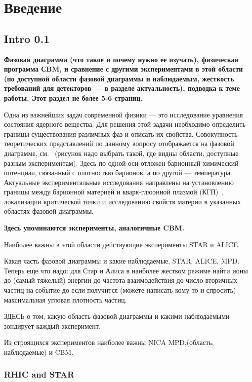 \chapter*{Введение}\label{sec:secIntro}

\section*{Intro 0.1}
\textbf{Фазовая диаграмма (что такое и почему нужно ее изучать), физическая программа СBM, и сравнение с другими экспериментами в этой области (по доступной области фазовой диаграммы и наблюдаемым, жесткость требований для детекторов --- в разделе актуальность), подводка к теме работы. Этот раздел не более 5-6 страниц.}

Одна из важнейших задач современной физики --- это исследование уравнения состояния ядерного вещества. Для решения этой задачи необходимо определить границы существования различных фаз и описать их свойства. Совокупность теоретических представлений по данному вопросу отображается на фазовой диаграмме, см.~\figref{} (рисунок надо выбрать такой, где видны области, доступные разным экспериментам). Здесь по одной оси отложен барионный химический потенциал, связанный с плотностью барионов, а по другой --- температура. Актуальные экспериментальные исследования направлены на установлению границы между барионной материей и кварк-глюонной плазмой (КГП)~\cite{}, локализации критической точки и исследованию свойств материи в указанных областях фазовой диаграммы.

\todo \textbf{Здесь упоминаются эксперименты, аналогичные CBM.}

Наиболее важны в этой области действующие эксперименты STAR и ALICE.

Какая часть фазовой диаграммы и какие наблюдаемые, STAR, ALICE, MPD.
Теперь еще что надо:
для Стар и Алиса в наиболее жестком режиме найти
ионы до (самый тяжелый)
энергии до
частота взаимодействия до
число вторичных частиц на событие до
если получится (можете написать кому-то и спросить) максимальная угловая плотность частиц.

ЗДЕСЬ о том, какую область фазовой диаграммы и какими наблюдаемыми зондирует каждый эксперимент.

Из строящихся экспериментов наиболее важны NICA MPD,(область, наблюдаемые) и CBM.

\subsection{RHIC and STAR}

